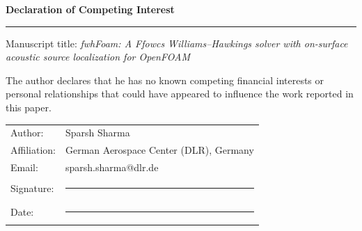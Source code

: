 \documentclass[11pt,a4paper]{article}
\begin{document}
{\large\bfseries Declaration of Competing Interest}

\vspace{6pt}
\hrule
\vspace{18pt}

Manuscript title: \emph{fwhFoam: A Ffowcs Williams--Hawkings solver with
on-surface acoustic source localization for OpenFOAM}

\vspace{18pt}

The author declares that he has no known competing financial interests or
personal relationships that could have appeared to influence the work
reported in this paper.

\vspace{36pt}

\begin{tabular}{@{}ll@{}}
Author: & Sparsh Sharma \\[4pt]
Affiliation: & German Aerospace Center (DLR), Germany \\[4pt]
Email: & sparsh.sharma@dlr.de \\[18pt]
Signature: & \rule{6cm}{0.4pt} \\[14pt]
Date: & \rule{6cm}{0.4pt} \\
\end{tabular}
\end{document}
